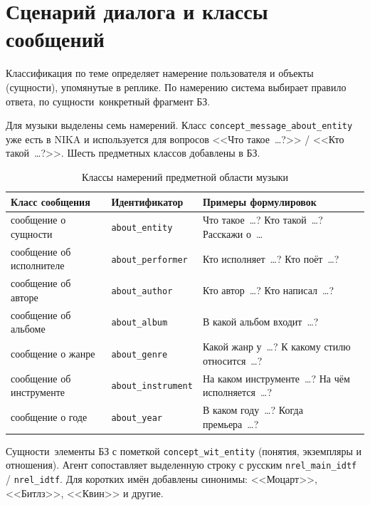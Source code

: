 \section{Сценарий диалога и классы сообщений}
\label{sec:work}

Классификация по теме определяет намерение пользователя и объекты (сущности), упомянутые в реплике. По намерению система выбирает правило ответа, по сущности~\mdash  конкретный фрагмент БЗ.

Для музыки выделены семь намерений. Класс \texttt{concept\_message\_about\_entity} уже есть в NIKA и используется для вопросов <<Что такое~\ldots?>> / <<Кто такой~\ldots?>>. Шесть предметных классов добавлены в БЗ.

\begin{table}[H]
	\centering
	\small
	\begin{tabular}{|p{3.6cm}|p{3.2cm}|p{6.4cm}|}
		\hline
		Класс сообщения & Идентификатор & Примеры формулировок \\
		\hline
		сообщение о сущности & \texttt{about\_entity} & Что такое~\ldots? Кто такой~\ldots? Расскажи о~\ldots \\
		\hline
		сообщение об исполнителе & \texttt{about\_performer} & Кто исполняет~\ldots? Кто поёт~\ldots? \\
		\hline
		сообщение об авторе & \texttt{about\_author} & Кто автор~\ldots? Кто написал~\ldots? \\
		\hline
		сообщение об альбоме & \texttt{about\_album} & В какой альбом входит~\ldots? \\
		\hline
		сообщение о жанре & \texttt{about\_genre} & Какой жанр у~\ldots? К какому стилю относится~\ldots? \\
		\hline
		сообщение об инструменте & \texttt{about\_instrument} & На каком инструменте~\ldots? На чём исполняется~\ldots? \\
		\hline
		сообщение о годе & \texttt{about\_year} & В каком году~\ldots? Когда премьера~\ldots? \\
		\hline
	\end{tabular}
	\caption{Классы намерений предметной области музыки}
	\label{tab:intents}
\end{table}

Сущности~\mdash  элементы БЗ с пометкой \texttt{concept\_wit\_entity} (понятия, экземпляры и отношения). Агент сопоставляет выделенную строку с русским \texttt{nrel\_main\_idtf} / \texttt{nrel\_idtf}. Для коротких имён добавлены синонимы: <<Моцарт>>, <<Битлз>>, <<Квин>> и другие.

